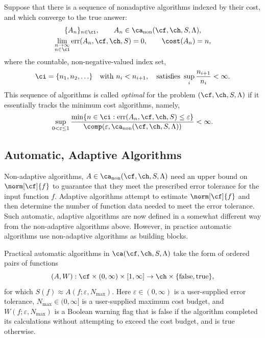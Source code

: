 \documentclass[]{elsarticle}
\DeclareMathOperator{\fix}{non}
\DeclareMathOperator{\err}{err}
\theoremstyle{definition}
\theoremstyle{remark}
\begin{document}
Suppose that there is a sequence of nonadaptive algorithms indexed by their cost, and which converge to the true answer:
\begin{subequations} \label{algseqdef}
\begin{gather} 
\{A_n\}_{n \in \ci}, \qquad A_n  \in \ca_{\fix}(\cf,\ch,S,\Lambda), \\
\lim_{\substack{n \to \infty\\ n \in \ci}} \err(A_n,\cf,\ch,S) = 0, \qquad \cost(A_n) = n,  
\end{gather}
\end{subequations}
where the countable, non-negative-valued index set, 
\begin{equation} \label{indexdef}
\ci=\{n_1, n_2, \ldots\} \quad \text{with } n_i < n_{i+1}, \quad \text{satisfies } \sup_i \frac{n_{i+1}}{n_i} <\infty. 
\end{equation} 
This sequence of algorithms is called \emph{optimal} for the problem $(\cf,\ch,S,\Lambda)$ if it essentially tracks the minimum cost algorithms, namely,
\begin{equation} \label{nearoptdef}
\sup_{0 < \varepsilon \le 1} \frac{\min\{n \in \ci : \err(A_n,\cf,\ch,S) \le \varepsilon\}} {\comp(\varepsilon,\ca_{\fix}(\cf,\ch,S,\Lambda))} <\infty.
\end{equation}

\subsection{Automatic, Adaptive Algorithms} \label{AutoAlgsec}

Non-adaptive algorithms, $A \in \ca_{\fix}(\cf,\ch,S,\Lambda)$ need an upper bound on $\norm[\cf]{f}$ to guarantee that they meet the prescribed error tolerance for the input function $f$.  Adaptive algorithms attempt to estimate $\norm[\cf]{f}$ and then determine the number of function data needed to meet the error tolerance.  Such automatic, adaptive algorithms are now defined in a somewhat different way from the non-adaptive algorithms above.  However, in practice automatic algorithms use non-adaptive algorithms as building blocks.

Practical automatic algorithms in $\ca(\cf,\ch,S,\Lambda)$ take the form of ordered pairs of functions
\[
(A,W): \cf \times (0,\infty)\times [1,\infty] \to \ch \times \{\text{false},\text{true}\},
\]
for which $S(f) \approx A(f;\varepsilon,N_{\max})$.  Here $\varepsilon \in (0,\infty)$ is a user-supplied error tolerance, $N_{\max} \in (0,\infty]$ is a user-supplied maximum cost budget, and $W(f;\varepsilon,N_{\max})$ is a Boolean warning flag that is false if the algorithm completed its calculations without attempting to exceed the cost budget, and is true otherwise.  
\end{document}
